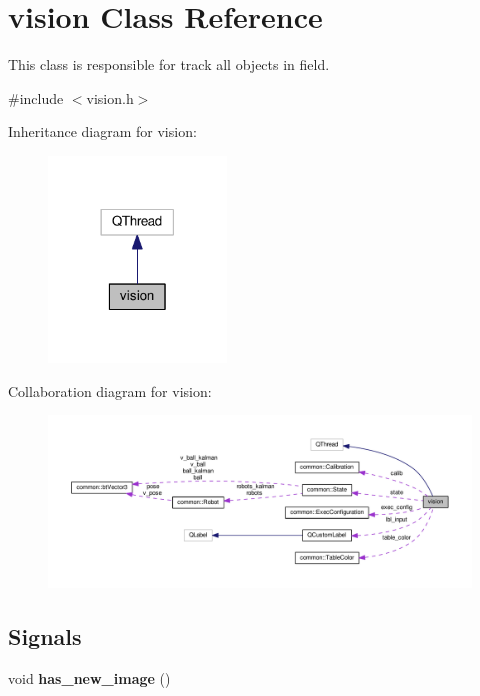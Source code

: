 \hypertarget{classvision}{\section{vision Class Reference}
\label{classvision}
}


This class is responsible for track all objects in field.  




{\ttfamily \#include $<$vision.\-h$>$}



Inheritance diagram for vision\-:
\nopagebreak
\begin{figure}[H]
\begin{center}
\leavevmode
\includegraphics[width=134pt]{classvision__inherit__graph}
\end{center}
\end{figure}


Collaboration diagram for vision\-:
\nopagebreak
\begin{figure}[H]
\begin{center}
\leavevmode
\includegraphics[width=350pt]{classvision__coll__graph}
\end{center}
\end{figure}
\subsection*{Signals}
\begin{DoxyCompactItemize}
\item 
\hypertarget{classvision_a3703b3999ceb3984f93f537aa2fc22a3}{void {\bfseries has\-\_\-new\-\_\-image} ()}\label{classvision_a3703b3999ceb3984f93f537aa2fc22a3}

\end{DoxyCompactItemize}
